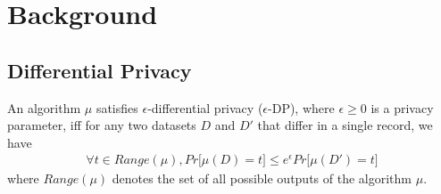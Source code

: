 
\section{Background}

\subsection{Differential Privacy}
\begin{definition} An algorithm $\mu$
satisfies $\epsilon$-differential privacy ($\epsilon$-DP), where $\epsilon \geq 0$ is a privacy parameter, iff
 for any two datasets $D$ and $D'$ that differ in a single record, we have
\begin{gather}
\forall t \in Range(\mu), Pr \big[\mu(D) = t\big] \leq e^{\epsilon}Pr\big[\mu(D') = t\big]
\end{gather}
where $Range(\mu)$ denotes the set of all possible outputs
of the algorithm $\mu$.
\end{definition}


